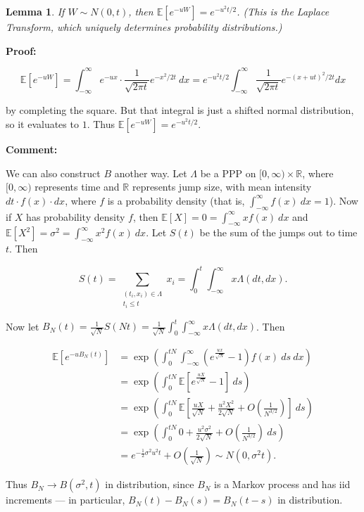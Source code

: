 \documentclass{article}
\theoremstyle{colontheorem}
\newtheorem{lemma}{Lemma}[theorem]
\newenvironment{Lemma}
{
	\begin{mdframed}[backgroundcolor=LemmaYellow!10]
	\begin{lemma}
}
{
	\end{lemma}
	\end{mdframed}
	
	\vspace{.03in}
}
\newenvironment{Comment}
{
	\begin{mdframed}[backgroundcolor=CommentBlue!10]
	\textbf{Comment:}%
}
{
	\end{mdframed}
	
	\vspace{.15in}
}
\newenvironment{Proof}
{
	\begin{mdframed}[backgroundcolor=ProofPurple!10]
	\textbf{Proof:}%
}
{
	\end{mdframed}
	
	\vspace{.085in}
}
\begin{document}
\begin{Lemma}
	
	If $W \sim N(0, t)$, then $\mathbb{E}[e^{-uW}] = e^{-u^2 t / 2}$. (This is the Laplace Transform, which uniquely determines probability distributions.)
	
\end{Lemma}



\begin{Proof}
	$$
		\mathbb{E}[e^{-uW}] = \int_{-\infty}^\infty e^{-ux} \cdot \frac{1}{\sqrt{2 \pi t}} e^{-x^2 / 2t}\ dx = e^{-u^2 t / 2} \int_{-\infty}^\infty \frac{1}{\sqrt{2 \pi t}} e^{-(x + ut)^2 / 2t} dx
	$$
	
	by completing the square. But that integral is just a shifted normal distribution, so it evaluates to $1$. Thus $\mathbb{E}[e^{-uW}] = e^{-u^2 t / 2}$.
	
\end{Proof}



\begin{Comment}
	We can also construct $B$ another way. Let $\Lambda$ be a PPP on $[0, \infty) \times \mathbb{R}$, where $[0, \infty)$ represents time and $\mathbb{R}$ represents jump size, with mean intensity $dt \cdot f(x) \cdot dx$, where $f$ is a probability density (that is, $\int_{-\infty}^\infty f(x)\ dx = 1$). Now if $X$ has probability density $f$, then $\mathbb{E}[X] = 0 = \int_{-\infty}^\infty x f(x)\ dx$ and $\mathbb{E}[X^2] = \sigma^2 = \int_{-\infty}^\infty x^2 f(x)\ dx$. Let $S(t)$ be the sum of the jumps out to time $t$. Then
	
	$$
		S(t) = \sum_{\substack{(t_i, x_i) \in \Lambda \\ t_i \leq t}} x_i = \int_0^t \int_{-\infty}^\infty x \Lambda(dt, dx).
	$$
	
	Now let $B_N(t) = \frac{1}{\sqrt{N}} S(Nt) = \frac{1}{\sqrt{N}}\int_0^t \int_{-\infty}^\infty x \Lambda(dt, dx)$. Then
	
	\begin{align*}
		\mathbb{E}[e^{-u B_N(t)}] &= \exp \left( \int_0^{tN} \int_{-\infty}^\infty (e^{\frac{ux}{\sqrt{N}}} - 1) f(x)\ ds\ dx \right)\\
		&= \exp \left( \int_0^{tN} \mathbb{E} \left[ e^{\frac{uX}{\sqrt{N}}} - 1 \right]\ ds \right)\\
		&= \exp \left( \int_0^{tN} \mathbb{E} \left[ \frac{uX}{\sqrt{N}} + \frac{u^2 X^2}{2 \sqrt{N}} + O\left( \frac{1}{N^{3/2}} \right) \right]\ ds \right)\\
		&= \exp \left( \int_0^{tN} 0 + \frac{u^2 \sigma^2}{2 \sqrt{N}} + O\left( \frac{1}{N^{3/2}} \right)\ ds \right)\\
		&= e^{- \frac{1}{2} \sigma^2 u^2 t} + O\left( \frac{1}{\sqrt{N}} \right) \sim N(0, \sigma^2 t).
	\end{align*}
	
	Thus $B_N \longrightarrow B(\sigma^2, t)$ in distribution, since $B_N$ is a Markov process and has iid increments --- in particular, $B_N(t) - B_N(s) = B_N(t - s)$ in distribution.
	
\end{Comment}
\end{document}
